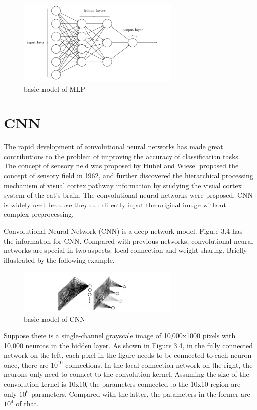 \begin{figure}[h]
	\centering
	\includegraphics[width=0.7\textwidth]{mlp.png}
	\caption{basic model of MLP}
\end{figure}


\section{CNN}
The rapid development of convolutional neural networks has made great contributions to the problem of improving the accuracy of classification tasks. The concept of sensory field was proposed by Hubel and Wiesel proposed the concept of sensory field in 1962, and further discovered the hierarchical processing mechanism of visual cortex pathway information by studying the visual cortex system of the cat's brain.\cite{cirecsan2012multi} The convolutional neural networks were proposed. CNN is widely used because they can directly input the original image without complex preprocessing.

Convolutional Neural Network (CNN) is a deep network model. Figure 3.4 has the information for CNN. Compared with previous networks, convolutional neural networks are special in two aspects: local connection and weight sharing. Briefly illustrated by the following example.


\begin{figure}[h]
	\centering
	\includegraphics[width=0.7\textwidth]{fullyConnected.png}
	\caption{basic model of CNN}
\end{figure}

Suppose there is a single-channel grayscale image of 10,000x1000 pixels with 10,000 neurons in the hidden layer. As shown in Figure 3.4, in the fully connected network on the left, each pixel in the figure needs to be connected to each neuron once, there are $10^{10}$ connections. In the local connection network on the right, the neurons only need to connect to the convolution kernel. 
Assuming the size of the convolution kernel is 10x10, the parameters connected to the 10x10 region are only $10^{6}$  parameters. Compared with the latter, the parameters in the former are $10^{4}$  of that.

